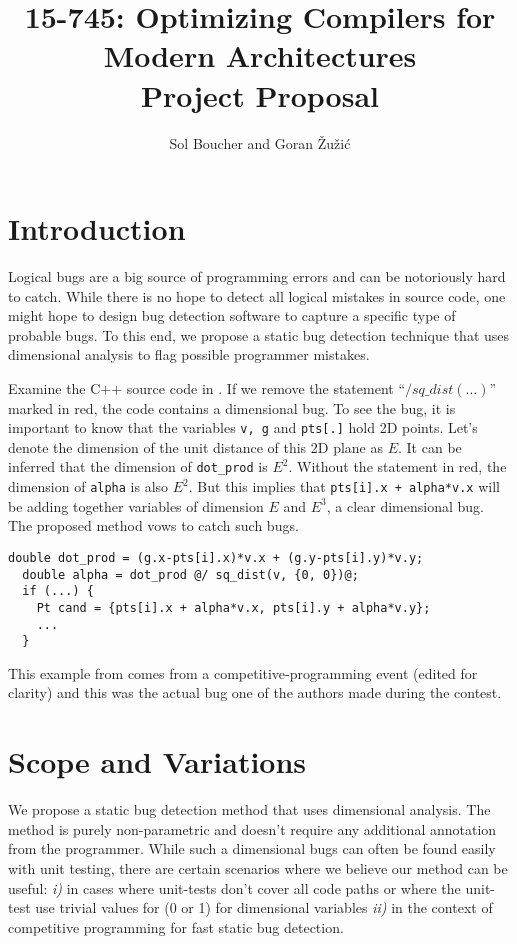 \documentclass[12pt]{article}
\title{{\small 15-745: Optimizing Compilers for Modern Architectures} \\ Project Proposal}
\author{Sol Boucher and Goran \v{Z}u\v{z}i\'c}
\begin{document}
\maketitle

\section{Introduction}

Logical bugs are a big source of programming errors and can be notoriously hard to catch. While there is no hope to detect all logical mistakes in source code, one might hope to design bug detection software to capture a specific type of probable bugs. To this end, we propose a static bug detection technique that uses dimensional analysis to flag possible programmer mistakes.

Examine the C++ source code in . If we remove the statement ``\texttt{$/ sq\_dist(...)$}'' marked in red, the code contains a dimensional bug. To see the bug, it is important to know that the variables \texttt{v, g} and \texttt{pts[.]} hold 2D points. Let's denote the dimension of the unit distance of this 2D plane as $E$. It can be inferred that the dimension of \texttt{dot\_prod} is $E^2$. Without the statement in red, the dimension of \texttt{alpha} is also $E^2$. But this implies that \texttt{pts[i].x + alpha*v.x} will be adding together variables of dimension $E$ and $E^3$, a clear dimensional bug. The proposed method vows to catch such bugs.

\begin{lstlisting}[label=code:example1,caption=Example of a dimensional bug]
  double dot_prod = (g.x-pts[i].x)*v.x + (g.y-pts[i].y)*v.y;
  double alpha = dot_prod @/ sq_dist(v, {0, 0})@;
  if (...) {
    Pt cand = {pts[i].x + alpha*v.x, pts[i].y + alpha*v.y};
    ...
  }
\end{lstlisting}

This example from  comes from a competitive-programming event (edited for clarity) and this was the actual bug one of the authors made during the contest. %

\section{Scope and Variations}

We propose a static bug detection method that uses dimensional analysis. The method is purely non-parametric and doesn't require any additional annotation from the programmer. While such a dimensional bugs can often be found easily with unit testing, there are certain scenarios where we believe our method can be useful: \textit{i)} in cases where unit-tests don't cover all code paths or where the unit-test use trivial values for (0 or 1) for dimensional variables \textit{ii)} in the context of competitive programming for fast static bug detection.
\end{document}
